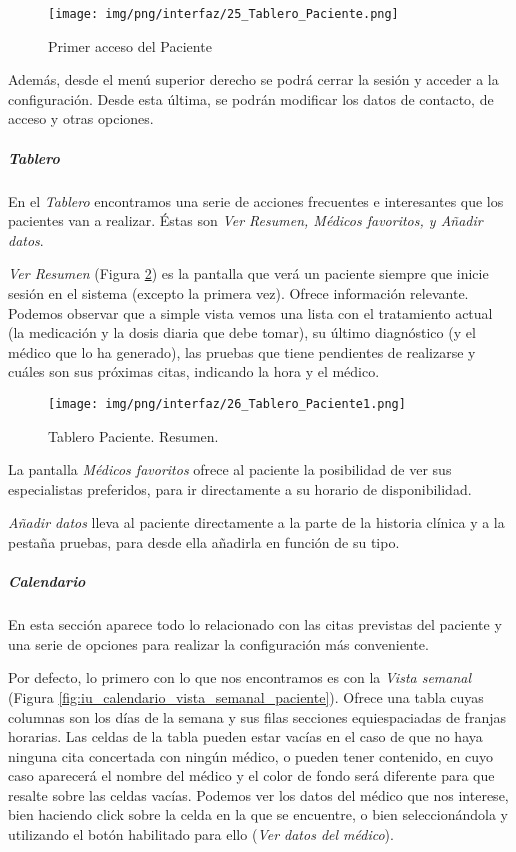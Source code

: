 \documentclass[a4paper,oneside,11pt]{book}
\begin{document}
		\begin{figure}[H]
		  \centering
		    \texttt{[image: img/png/interfaz/25\_Tablero\_Paciente.png]}
		  \caption{Primer acceso del Paciente}
		  \label{fig:iu_tablero_paciente_inicial}
		\end{figure}
	
		Además, desde el menú superior derecho se podrá cerrar la sesión y acceder a la configuración. Desde esta última, se podrán modificar los datos de contacto, de acceso y otras opciones.
		
		\subparagraph{Tablero} %
		\label{par:paciente_tablero}
		En el \textit{Tablero} encontramos una serie de acciones frecuentes e interesantes que los pacientes van a realizar. Éstas son \textit{Ver Resumen, Médicos favoritos, y Añadir datos}.
		
		\textit{Ver Resumen} (Figura \ref{fig:iu_tablero_paciente_resumen}) es la pantalla que verá un paciente siempre que inicie sesión en el sistema (excepto la primera vez). Ofrece información relevante. Podemos observar que a simple vista vemos una lista con el tratamiento actual (la medicación y la dosis diaria que debe tomar), su último diagnóstico (y el médico que lo ha generado), las pruebas que tiene pendientes de realizarse y cuáles son sus próximas citas, indicando la hora y el médico.
	
		\begin{figure}[H]
		  \centering
		    \texttt{[image: img/png/interfaz/26\_Tablero\_Paciente1.png]}
		  \caption{Tablero Paciente. Resumen.}
		  \label{fig:iu_tablero_paciente_resumen}
		\end{figure}
		
		La pantalla \textit{Médicos favoritos} ofrece al paciente la posibilidad de ver sus especialistas preferidos, para ir directamente a su horario de disponibilidad.	
		
		\textit{Añadir datos} lleva al paciente directamente a la parte de la historia clínica y a la pestaña pruebas, para desde ella añadirla en función de su tipo.
		
		
		
		\subparagraph{Calendario} %
		\label{par:paciente_calendario}
		
		En esta sección aparece todo lo relacionado con las citas previstas del paciente y una serie de opciones para realizar la configuración  más conveniente.
		
		Por defecto, lo primero con lo que nos encontramos es con la \textit{Vista semanal} (Figura \ref{fig:iu_calendario_vista_semanal_paciente}). Ofrece una tabla cuyas columnas son los días de la semana y sus filas secciones equiespaciadas de franjas horarias. Las celdas de la tabla pueden estar vacías en el caso de que no haya ninguna cita concertada con ningún médico, o pueden tener contenido, en cuyo caso aparecerá el nombre del médico y el color de fondo será diferente para que resalte sobre las celdas vacías. Podemos ver los datos del médico que nos interese, bien haciendo click sobre la celda en la que se encuentre, o bien seleccionándola y utilizando el botón habilitado para ello (\textit{Ver datos del médico}). 
		
\end{document}
